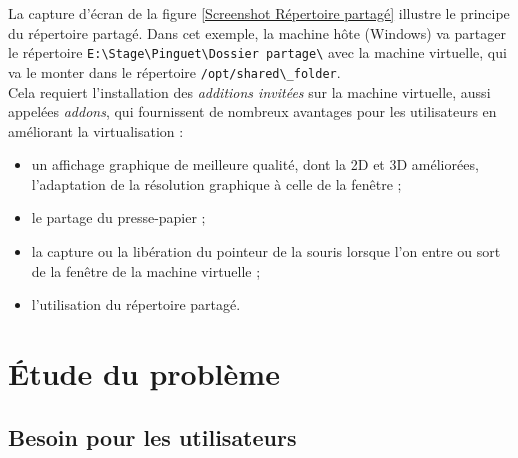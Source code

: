 La capture d'écran de la figure \ref{Screenshot Répertoire partagé} illustre le principe du répertoire partagé.
Dans cet exemple, la machine hôte (Windows) va partager le répertoire \lstinline{E:\Stage\Pinguet\Dossier partage\} avec la machine virtuelle, qui va le monter dans le répertoire \lstinline{/opt/shared\_folder}.
\\


Cela requiert l'installation des \textit{additions invitées} sur la machine virtuelle, aussi appelées \textit{addons}, qui fournissent de nombreux avantages pour les utilisateurs en améliorant la virtualisation :
\begin{itemize}
	\item un affichage graphique de meilleure qualité, dont la 2D et 3D améliorées, l'adaptation de la résolution graphique à celle de la fenêtre ;
	\item le partage du presse-papier ;
	\item la capture ou la libération du pointeur de la souris lorsque l'on entre ou sort de la fenêtre de la machine virtuelle ;
	\item l'utilisation du répertoire partagé.
\\
\end{itemize}






\section{Étude du problème}


\subsection{Besoin pour les utilisateurs}

